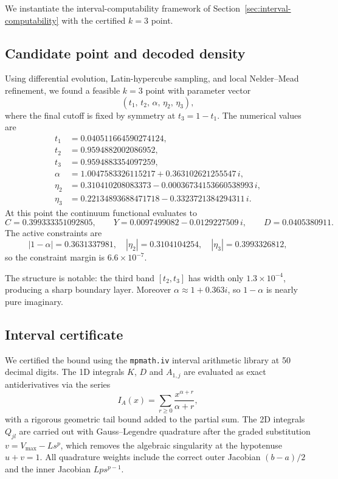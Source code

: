 \documentclass[11pt]{article}
\theoremstyle{plain}
\begin{document}
We instantiate the interval-computability framework of Section~\ref{sec:interval-computability} with the certified $k=3$ point.

\subsection{Candidate point and decoded density}\label{sec:point}

Using differential evolution, Latin-hypercube sampling, and local Nelder--Mead refinement, we found a feasible $k=3$ point with parameter vector
\[
(t_1,\,t_2,\,\alpha,\,\eta_2,\,\eta_3),
\]
where the final cutoff is fixed by symmetry at $t_3=1-t_1$.  The numerical values are
\begin{align*}
t_1 &= 0.040511664590274124,\\
t_2 &= 0.9594882002086952,\\
t_3 &= 0.9594883354097259,\\
\alpha &= 1.0047583326115217 + 0.363102621255547\,i,\\
\eta_2 &= 0.310410208083373 - 0.00036734153660538993\,i,\\
\eta_3 &= 0.22134893688471718 - 0.3323721384294311\,i.
\end{align*}
At this point the continuum functional evaluates to
\[
C = 0.399333351092805,\qquad Y=0.0097499082-0.0129227509\,i,\qquad D=0.0405380911.
\]
The active constraints are
\[
|1-\alpha| = 0.3631337981,\quad |\eta_2|=0.3104104254,\quad |\eta_3|=0.3993326812,
\]
so the constraint margin is $6.6\times10^{-7}$.

The structure is notable: the third band $[t_2,t_3]$ has width only $1.3\times10^{-4}$, producing a sharp boundary layer.  Moreover $\alpha\approx 1+0.363i$, so $1-\alpha$ is nearly pure imaginary.

\subsection{Interval certificate}\label{sec:interval}

We certified the bound using the \texttt{mpmath.iv} interval arithmetic library at 50 decimal digits.  The 1D integrals $K$, $D$ and $A_{1,j}$ are evaluated as exact antiderivatives via the series
\[
I_A(x)=\sum_{r\ge0}\frac{x^{\alpha+r}}{\alpha+r},
\]
with a rigorous geometric tail bound added to the partial sum.  The 2D integrals $Q_{jl}$ are carried out with Gauss--Legendre quadrature after the graded substitution $v=V_{\max}-L s^p$, which removes the algebraic singularity at the hypotenuse $u+v=1$.  All quadrature weights include the correct outer Jacobian $(b-a)/2$ and the inner Jacobian $L p s^{p-1}$.
\end{document}

